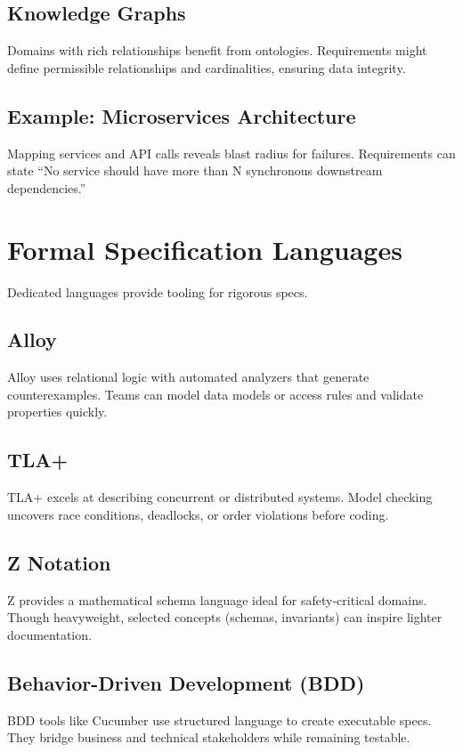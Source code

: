 \subsection{Knowledge Graphs}
Domains with rich relationships benefit from ontologies. Requirements might define permissible relationships and cardinalities, ensuring data integrity.

\subsection{Example: Microservices Architecture}
Mapping services and API calls reveals blast radius for failures. Requirements can state ``No service should have more than N synchronous downstream dependencies.''

\section{Formal Specification Languages}
\label{sec:formal-languages}

Dedicated languages provide tooling for rigorous specs.

\subsection{Alloy}
Alloy uses relational logic with automated analyzers that generate counterexamples. Teams can model data models or access rules and validate properties quickly.

\subsection{TLA+}
TLA+ excels at describing concurrent or distributed systems. Model checking uncovers race conditions, deadlocks, or order violations before coding.

\subsection{Z Notation}
Z provides a mathematical schema language ideal for safety-critical domains. Though heavyweight, selected concepts (schemas, invariants) can inspire lighter documentation.

\subsection{Behavior-Driven Development (BDD)}
BDD tools like Cucumber use structured language to create executable specs. They bridge business and technical stakeholders while remaining testable.

